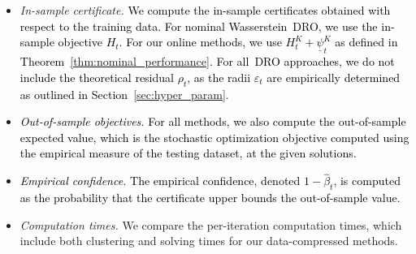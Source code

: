 \documentclass[12pt]{article}
\newcommand{\epsnom}{\varepsilon}
\newcommand{\RC}[1]{\textcolor{black}{#1}}
\newcommand{\RC}[1]{\textcolor{blue}{#1}}
\begin{document}
\begin{itemize}
    \item \textit{In-sample certificate.}
    \RC{We compute the in-sample certificates obtained with respect to the training data. For nominal Wasserstein~\gls{DRO}, we use the in-sample objective $H_t$. For our online methods, we use $H^K_t  +\underline{\psi}_t^K$ as defined in Theorem~\ref{thm:nominal_performance}.} \RC{For all~\gls{DRO} approaches, we do not include the theoretical residual $\rho_t$, as the radii $\epsnom_t$ are empirically determined as outlined in Section~\ref{sec:hyper_param}}.

    \item \RC{\textit{Out-of-sample objectives.} For all methods, we also compute the out-of-sample expected value, which is the stochastic optimization objective computed using the empirical measure of the testing dataset, at the given solutions.} 
    
    \item \RC{\textit{Empirical confidence.}
    The empirical confidence, denoted $1 - \hat{\beta}_t$, is computed as the probability that the certificate upper bounds the out-of-sample value.}
    
    \item \textit{Computation times.}
    We compare the per-iteration computation times, which include both clustering and solving times for our data-compressed methods. 
\end{itemize}


\end{document}
